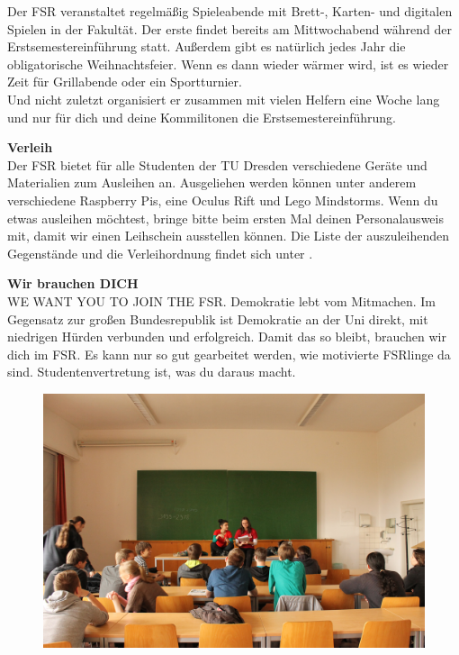 Der FSR veranstaltet regelmäßig Spieleabende mit Brett-, Karten- und digitalen Spielen in der Fakultät. Der erste findet bereits am Mittwochabend während der Erstsemestereinführung statt.
Außerdem gibt es natürlich jedes Jahr die obligatorische Weihnachtsfeier.
Wenn es dann wieder wärmer wird, ist es wieder Zeit für Grillabende oder ein Sportturnier. \\

Und nicht zuletzt organisiert er zusammen mit vielen Helfern eine Woche lang und nur für dich und deine Kommilitonen die Erstsemestereinführung.

\newpage

\textbf{Verleih} \\
Der FSR bietet für alle Studenten der TU Dresden verschiedene Geräte und Materialien zum Ausleihen an. Ausgeliehen werden können unter anderem verschiedene Raspberry Pis, eine Oculus Rift und Lego Mindstorms.
Wenn du etwas ausleihen möchtest, bringe bitte beim ersten Mal deinen Personalausweis mit, damit wir einen Leihschein ausstellen können. 
Die Liste der auszuleihenden Gegenstände und die Verleihordnung findet sich unter .

\textbf{Wir brauchen DICH} \\
WE WANT YOU TO JOIN THE FSR.
Demokratie lebt vom Mitmachen.
Im Gegensatz zur großen Bundesrepublik ist Demokratie an der Uni direkt, mit niedrigen Hürden verbunden und erfolgreich.
Damit das so bleibt, brauchen wir dich im FSR.
Es kann nur so gut gearbeitet werden, wie motivierte FSRlinge da sind.
Studentenvertretung ist, was du daraus macht.

\begin{figure}
\includegraphics[width=\linewidth]{img/ese2013/tutorium.jpg}
\end{figure}

